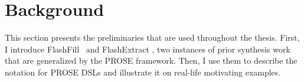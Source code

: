 \chapter{Background}
\label{ch:background}
This section presents the preliminaries that are used throughout the thesis.
First, I introduce FlashFill~\cite{flashfill} and FlashExtract \cite{flashextract}, two instances of prior
synthesis work that are generalized by the PROSE framework.
Then, I use them to describe the notation for PROSE DSLs and illustrate it on real-life motivating examples.





